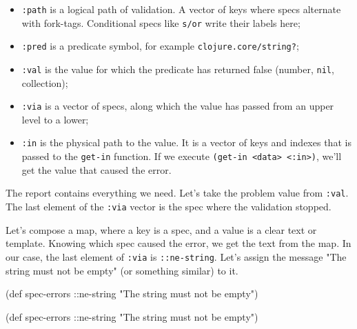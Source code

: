 \begin{itemize}

\item
  \verb|:path| is a logical path of validation. A vector of keys where specs alternate with fork-tags. Conditional specs like \verb|s/or| write their labels here;

\item
  \verb|:pred| is a predicate symbol, for example \texttt{clo\-ju\-re.\-core/\-string?};

\item
  \verb|:val| is the value for which the predicate has returned false (number,  \verb|nil|, collection);

\item
  \verb|:via| is a vector of specs, along which the value has passed from an upper level to a lower;

\item
  \verb|:in| is the physical path to the value. It is a vector of keys and indexes that is passed to the \verb|get-in| function. If we execute \verb|(get-in <data> <:in>)|, we'll get the value that caused the error.

\end{itemize}

The report contains everything we need. Let's take the problem value from \verb|:val|. The last element of the \verb|:via| vector is the spec where the validation stopped.

Let's compose a map, where a key is a spec, and a value is a clear text or template. Knowing which spec caused the error, we get the text from the map. In our case, the last element of \verb|:via| is \verb|::ne-string|. Let's assign the message "The string must not be empty" (or something similar) to it.

\ifx\DEVICETYPE\MOBILE

  \begin{clojure}
(def spec-errors
  {::ne-string
   "The string must not be empty"})
  \end{clojure}

\else

  \begin{clojure}
(def spec-errors
  {::ne-string "The string must not be empty"})
  \end{clojure}


